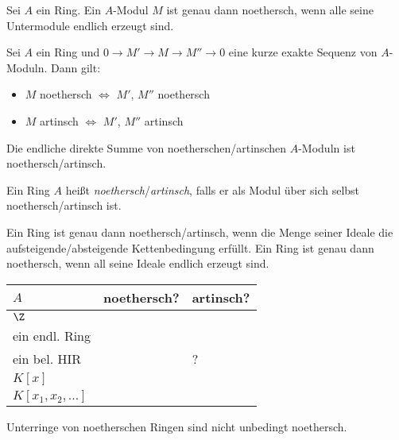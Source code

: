\documentclass{cheat-sheet}
\newcommand{\cmark}{\ding{51}}
\newcommand{\xmark}{\ding{55}}
\begin{document}
\begin{prop}
  Sei $A$ ein Ring.
  Ein $A$-Modul $M$ ist genau dann noethersch, wenn alle seine Untermodule endlich erzeugt sind.
\end{prop}

\begin{prop}
  Sei $A$ ein Ring und $0 \to M' \to M \to M'' \to 0$ eine kurze exakte Sequenz von $A$-Moduln.
  Dann gilt:
  \begin{itemize}
    \item $M$ noethersch $\iff$ $M'$, $M''$ noethersch
    \item $M$ artinsch $\iff$ $M'$, $M''$ artinsch
  \end{itemize}
\end{prop}

\begin{kor}
  Die endliche direkte Summe von noetherschen/artinschen $A$-Moduln ist noethersch/artinsch.
\end{kor}


\begin{defn}
  Ein Ring $A$ heißt \emph{noethersch}/\emph{artinsch}, falls er als Modul über sich selbst noethersch/artinsch ist.
\end{defn}

\begin{bem}
  Ein Ring ist genau dann noethersch/artinsch, wenn die Menge seiner Ideale die aufsteigende/absteigende Kettenbedingung erfüllt.
  Ein Ring ist genau dann noethersch, wenn all seine Ideale endlich erzeugt sind.
\end{bem}

\begin{bspe}
  \begin{minipage}[t]{0.88 \linewidth}
    \begin{tabular}[t]{l | l | l}
      $A$ & noethersch? & artinsch? \\ \hline
      $\Z$ & \cmark & \xmark \\
      ein endl. Ring & \cmark & \cmark \\
      ein bel. HIR & \cmark & ? \\
      $K[x]$ & \cmark & \xmark \\
      $K[x_1, x_2, \ldots]$ & \xmark & \xmark
    \end{tabular}
  \end{minipage}
\end{bspe}

\begin{acht}
  Unterringe von noetherschen Ringen sind nicht unbedingt noethersch.
\end{acht}
\end{document}
